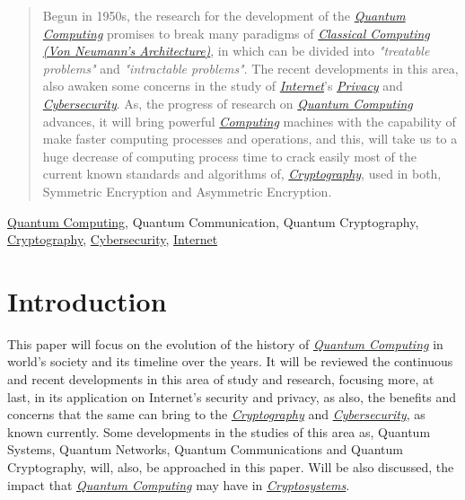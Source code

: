 \documentclass[conference]{IEEEtran}
\begin{document}
\begin{abstract}
Begun in 1950s, the research for the development of the \href{https://en.wikipedia.org/wiki/Quantum_computing}{\textit{Quantum Computing}} promises to break many paradigms of \href{https://en.wikipedia.org/wiki/Von_Neumann_architecture}{\textit{Classical Computing (Von Neumann's Architecture)}}, in which can be divided into \textit{"treatable problems"} and \textit{"intractable problems"}. The recent developments in this area, also awaken some concerns in the study of \href{https://en.wikipedia.org/wiki/Internet}{\textit{Internet}}'s \href{https://en.wikipedia.org/wiki/Privacy}{\textit{Privacy}} and \href{https://en.wikipedia.org/wiki/Computer_security}{\textit{Cybersecurity}}. As, the progress of research on \href{https://en.wikipedia.org/wiki/Quantum_computing}{\textit{Quantum Computing}} advances, it will bring powerful \href{https://en.wikipedia.org/wiki/Computing}{\textit{Computing}} machines with the capability of make faster computing processes and operations, and this, will take us to a huge decrease of computing process time to crack easily most of the current known standards and algorithms of, \href{https://en.wikipedia.org/wiki/Cryptography}{\textit{Cryptography}}, used in both, Symmetric Encryption and Asymmetric Encryption.
\end{abstract}

\begin{IEEEkeywords}
\href{https://en.wikipedia.org/wiki/Quantum_computing}{Quantum Computing}, Quantum Communication, Quantum Cryptography, \href{https://en.wikipedia.org/wiki/Cryptography}{Cryptography}, \href{https://en.wikipedia.org/wiki/Computer_security}{Cybersecurity}, \href{https://en.wikipedia.org/wiki/Internet}{Internet}
\end{IEEEkeywords}

\section{Introduction}
This paper will focus on the evolution of the history of \href{https://en.wikipedia.org/wiki/Quantum_computing}{\textit{Quantum Computing}} in world's society and its timeline over the years. It will be reviewed the continuous and recent developments in this area of study and research, focusing more, at last, in its application on Internet's security and privacy, as also, the benefits and concerns that the same can bring to the \href{https://en.wikipedia.org/wiki/Cryptography}{\textit{Cryptography}} and \href{https://en.wikipedia.org/wiki/Computer_security}{\textit{Cybersecurity}}, as known currently. Some developments in the studies of this area as, Quantum Systems, Quantum Networks, Quantum Communications and Quantum Cryptography, will, also, be approached in this paper. Will be also discussed, the impact that \href{https://en.wikipedia.org/wiki/Quantum_computing}{\textit{Quantum Computing}} may have in \href{https://en.wikipedia.org/wiki/Cryptosystem}{\textit{Cryptosystems}}. 
\end{document}
